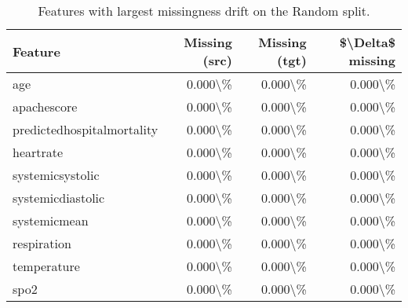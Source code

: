 \begin{table}
\caption{Features with largest missingness drift on the Random split.}
\label{tab:missingness-random}
\begin{tabular}{lrrr}
\toprule
Feature & Missing (src) & Missing (tgt) & \$\textbackslash Delta\$ missing \\
\midrule
age & 0.000\textbackslash \% & 0.000\textbackslash \% & 0.000\textbackslash \% \\
apachescore & 0.000\textbackslash \% & 0.000\textbackslash \% & 0.000\textbackslash \% \\
predictedhospitalmortality & 0.000\textbackslash \% & 0.000\textbackslash \% & 0.000\textbackslash \% \\
heartrate & 0.000\textbackslash \% & 0.000\textbackslash \% & 0.000\textbackslash \% \\
systemicsystolic & 0.000\textbackslash \% & 0.000\textbackslash \% & 0.000\textbackslash \% \\
systemicdiastolic & 0.000\textbackslash \% & 0.000\textbackslash \% & 0.000\textbackslash \% \\
systemicmean & 0.000\textbackslash \% & 0.000\textbackslash \% & 0.000\textbackslash \% \\
respiration & 0.000\textbackslash \% & 0.000\textbackslash \% & 0.000\textbackslash \% \\
temperature & 0.000\textbackslash \% & 0.000\textbackslash \% & 0.000\textbackslash \% \\
spo2 & 0.000\textbackslash \% & 0.000\textbackslash \% & 0.000\textbackslash \% \\
\bottomrule
\end{tabular}
\end{table}
